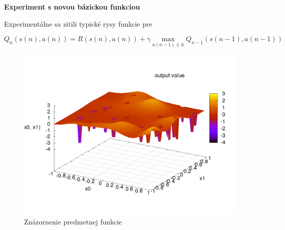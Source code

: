 \documentclass[xcolor=dvipsnames]{beamer}
\begin{document}
\begin{frame}{\bf Experiment s novou bázickou funkciou}

Experimentálne sa zitili typické rysy funkcie pre

\begin{equation*}
Q_{n}(s(n),a(n)) = R(s(n),a(n)) + \gamma \max_{a(n-1) \in \mathbb{A}} Q_{n-1}(s(n-1), a(n-1))
\label{eq:q_learning}
\end{equation*}

\begin{figure}[]
\center
\includegraphics[scale=.35]{../pictures/peak_hill_function.png}
\caption{Znázornenie predmetnej funkcie}
\label{img:peak_hill_funcion}
\end{figure}

\end{frame}
\end{document}
